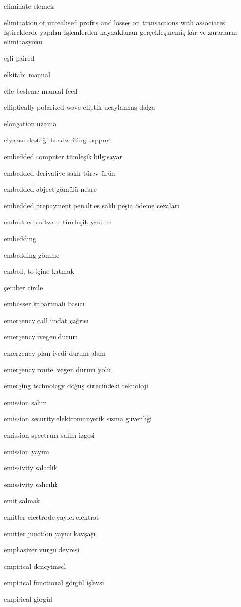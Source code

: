 \documentclass[12pt,fleqn]{article}\usepackage{../../common}
\begin{document}
eliminate elemek

elimination of unrealised profits and losses on transactions with associates İştiraklerde yapılan İşlemlerden kaynaklanan gerçekleşmemiş kâr ve zararların eliminasyonu

eşli paired

elkitabı manual

elle besleme manual feed

elliptically polarized wave eliptik ucaylanmış dalga

elongation uzama

elyazısı desteği handwriting support

embedded computer tümleşik bilgisayar

embedded derivative saklı türev ürün

embedded object gömülü nesne

embedded prepayment penalties saklı peşin ödeme cezaları

embedded software tümleşik yazılım

embedding

embedding gömme

embed, to içine katmak

çember circle

embosser kabartmalı basıcı

emergency call imdat çağrısı

emergency ivegen durum

emergency plan ivedi durum planı

emergency route ivegen durum yolu

emerging technology doğuş sürecindeki teknoloji

emission salım

emission security elektromanyetik sızma güvenliği

emission spectrum salim izgesi

emission yayım

emissivity salarlik

emissivity salıcılık

emit salmak

emitter electrode yayıcı elektrot

emitter junction yayıcı kavşağı

emphasizer vurgu devresi

empirical deneyimsel

empirical functional görgül işlevsi

empirical görgül
\end{document}
